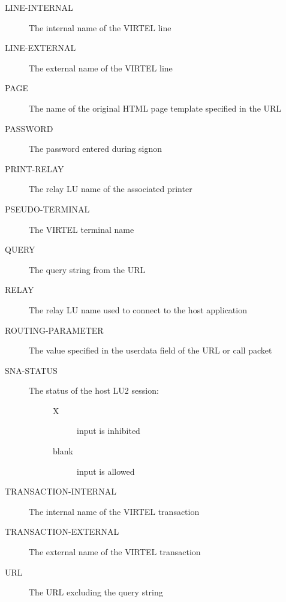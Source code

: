 \documentclass[letterpaper,10pt,english]{sphinxmanual}
\begin{document}
\begin{description}
\begin{description}
\begin{description}
\item[{LINE-INTERNAL}] \leavevmode
The internal name of the VIRTEL line

\item[{LINE-EXTERNAL}] \leavevmode
The external name of the VIRTEL line

\item[{PAGE}] \leavevmode
The name of the original HTML page template specified in the URL

\item[{PASSWORD}] \leavevmode
The password entered during signon

\item[{PRINT-RELAY}] \leavevmode
The relay LU name of the associated printer

\item[{PSEUDO-TERMINAL}] \leavevmode
The VIRTEL terminal name

\item[{QUERY}] \leavevmode
The query string from the URL

\item[{RELAY}] \leavevmode
The relay LU name used to connect to the host application

\item[{ROUTING-PARAMETER}] \leavevmode
The value specified in the userdata field of the URL or call packet

\item[{SNA-STATUS}] \leavevmode\begin{description}
\item[{The status of the host LU2 session:}] \leavevmode\begin{description}
\item[{X}] \leavevmode
input is inhibited

\item[{blank}] \leavevmode
input is allowed

\end{description}

\end{description}

\item[{TRANSACTION-INTERNAL}] \leavevmode
The internal name of the VIRTEL transaction

\item[{TRANSACTION-EXTERNAL}] \leavevmode
The external name of the VIRTEL transaction

\item[{URL}] \leavevmode
The URL excluding the query string


\end{description}
\end{description}
\end{description}
\end{document}
